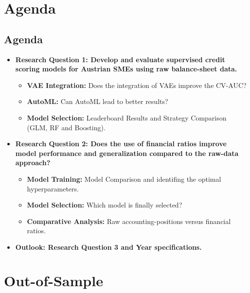 \documentclass{report}\usepackage[]{graphicx}\usepackage[]{xcolor}
\begin{document}
\chapter{Agenda}

\section{Agenda}

\begin{itemize}
    \item \textbf{Research Question 1: Develop and evaluate supervised credit scoring models for
Austrian SMEs using raw balance-sheet data.}
    \begin{itemize}
        \item \textbf{VAE Integration:} Does the integration of VAEs improve the CV-AUC?
        \item \textbf{AutoML:} Can AutoML lead to better results?
        \item \textbf{Model Selection:} Leaderboard Results and Strategy Comparison (GLM, RF and Boosting).
    \end{itemize}

    \vspace{0.5cm} %

    \item \textbf{Research Question 2: Does the use of financial ratios improve model performance and 
generalization compared to the raw-data approach?}
    \begin{itemize}
        \item \textbf{Model Training:} Model Comparison and identifing the optimal hyperparameters.
        \item \textbf{Model Selection:} Which model is finally selected?
        \item \textbf{Comparative Analysis:} Raw accounting-positions versus financial ratios.
    \end{itemize}
    
    \item \textbf{Outlook: Research Question 3 and Year specifications.}

\end{itemize}


\chapter{Out-of-Sample}
\end{document}
